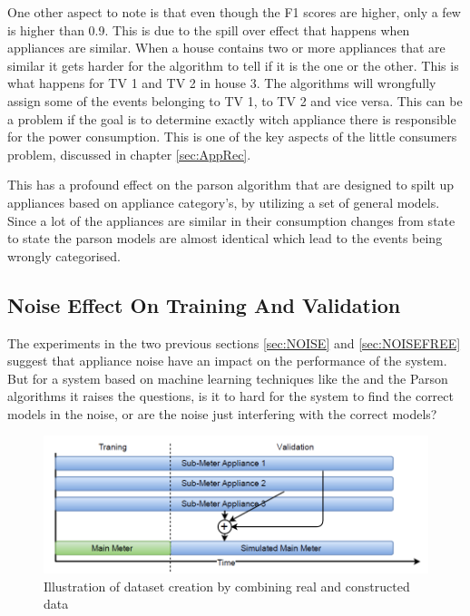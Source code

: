 One other aspect to note is that even though the F1 scores are higher, only a few is higher than 0.9. This is due to the spill over effect that happens when appliances are similar. When a house contains two or more appliances that are similar it gets harder for the algorithm to tell if it is the one or the other. This is what happens for TV 1 and TV 2 in house 3. The algorithms will wrongfully assign some of the events belonging to TV 1, to TV 2 and vice versa. This can be a problem if the goal is to determine exactly witch appliance there is responsible for the power consumption. This is one of the key aspects of the little consumers problem, discussed in chapter \ref{sec:AppRec}.

This has a profound effect on the parson algorithm that are designed to spilt up appliances based on appliance category's, by utilizing a set of general models. Since a lot of the appliances are similar in their consumption changes from state to state the parson models are almost identical which lead to the events being wrongly categorised. 

\newpage

\subsection{Noise Effect On Training And Validation }
The experiments in the two previous sections \ref{sec:NOISE} and \ref{sec:NOISEFREE} suggest that appliance noise have an impact on the performance of the system. But for a system based on machine learning techniques like the  and the Parson algorithms it raises the questions, is it to hard for the system to find the correct models in the noise, or are the noise just interfering with the correct models? 

\begin{figure}[H]
\centering
\includegraphics[width=1\textwidth]{billeder/REALSIM.png}
\caption{Illustration of dataset creation by combining real and constructed data}
\label{fig:REALSIMILU}
\end{figure}

